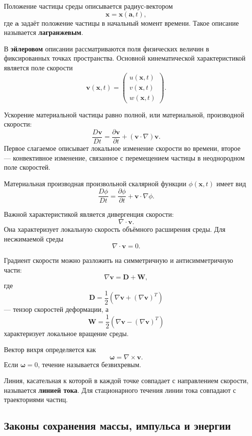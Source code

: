 Положение частицы среды описывается радиус-вектором
\[
\mathbf{x}=\mathbf{x}(\mathbf{a},t),
\]
где $\mathbf{a}$ задаёт положение частицы в начальный момент времени. Такое описание называется \textbf{лагранжевым}.

В \textbf{эйлеровом} описании рассматриваются поля физических величин в фиксированных точках пространства. Основной кинематической характеристикой является поле скорости
\[
\mathbf{v}(\mathbf{x},t)
=
\begin{pmatrix}
	u(\mathbf{x},t)\\
	v(\mathbf{x},t)\\
	w(\mathbf{x},t)
\end{pmatrix}.
\]

Ускорение материальной частицы равно полной, или материальной, производной скорости:
\[
\frac{D\mathbf{v}}{Dt}
=
\frac{\partial \mathbf{v}}{\partial t}
+
(\mathbf{v}\cdot\nabla)\mathbf{v}.
\]
Первое слагаемое описывает локальное изменение скорости во времени, второе --- конвективное изменение, связанное с перемещением частицы в неоднородном поле скоростей.

Материальная производная произвольной скалярной функции
$\phi(\mathbf{x},t)$ имеет вид
\[
\frac{D\phi}{Dt}
=
\frac{\partial \phi}{\partial t}
+
\mathbf{v}\cdot\nabla\phi.
\]

Важной характеристикой является дивергенция скорости:
\[
\nabla\cdot\mathbf{v}.
\]
Она характеризует локальную скорость объёмного расширения среды. Для несжимаемой среды
\[
\nabla\cdot\mathbf{v}=0.
\]

Градиент скорости можно разложить на симметричную и антисимметричную части:
\[
\nabla\mathbf{v}
=
\mathbf{D}+\mathbf{W},
\]
где
\[
\mathbf{D}
=
\frac12\left(
\nabla\mathbf{v}+(\nabla\mathbf{v})^{T}
\right)
\]
--- тензор скоростей деформации, а
\[
\mathbf{W}
=
\frac12\left(
\nabla\mathbf{v}-(\nabla\mathbf{v})^{T}
\right)
\]
характеризует локальное вращение среды.

Вектор вихря определяется как
\[
\boldsymbol{\omega}=\nabla\times\mathbf{v}.
\]
Если $\boldsymbol{\omega}=0$, течение называется безвихревым.

Линия, касательная к которой в каждой точке совпадает с направлением скорости, называется \textbf{линией тока}. Для стационарного течения линии тока совпадают с траекториями частиц.

\subsection{Законы сохранения массы, импульса и энергии}

